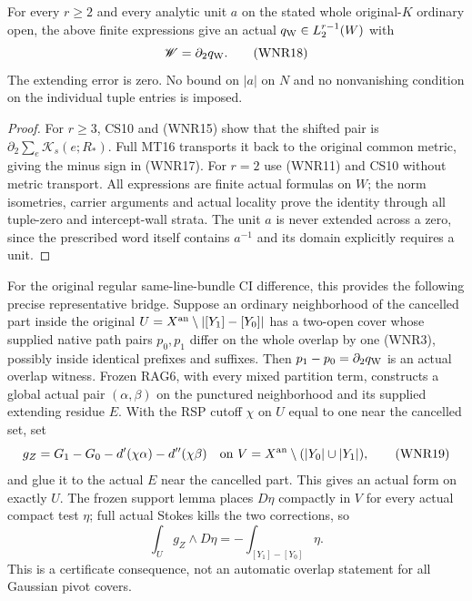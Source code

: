 \begin{theorem}
For every $r\ge2$ and every analytic unit $a$ on the stated whole
original-$K$ ordinary open, the above finite expressions give an
actual $q_{\rm W}\in L_2^{r-1}(W)$ with
\[
                              \mathscr W=\partial_2q_{\rm W}.
 \tag{WNR18}
\]
The extending error is zero.  No bound on $|a|$ on $N$ and no
nonvanishing condition on the individual tuple entries is imposed.
\end{theorem}

\begin{proof}
For $r\ge3$, CS10 and (WNR15) show that the shifted pair is
$\partial_2\sum_e\mathcal K_s(e;R_*)$.  Full MT16 transports
it back to the original common metric, giving the minus sign in
(WNR17).  For $r=2$ use (WNR11) and CS10 without metric transport.
All expressions are finite actual formulas on $W$; the norm
isometries, carrier arguments and actual locality prove the identity
through all tuple-zero and intercept-wall strata.  The unit $a$
is never extended across a zero, since the prescribed word itself
contains $a^{-1}$ and its domain explicitly requires a unit.
\end{proof}

For the original regular same-line-bundle CI difference, this
provides the following precise representative bridge.  Suppose an
ordinary neighborhood of the cancelled part inside the original
$U=X^{\rm an}\setminus|[Y_1]-[Y_0]|$ has a two-open cover whose
supplied native path pairs $p_0,p_1$ differ on the whole overlap
by one (WNR3), possibly inside identical prefixes and suffixes.
Then $p_1-p_0=\partial_2q_{\rm W}$ is an actual overlap witness.
Frozen RAG6, with every mixed partition term, constructs a global
actual pair $(\alpha,\beta)$ on the punctured neighborhood and
its supplied extending residue $E$.  With the RSP cutoff $\chi$
on $U$ equal to one near the cancelled set, set
\[
 g_Z=G_1-G_0-d'(\chi\alpha)-d''(\chi\beta)
 \quad\hbox{on }V=X^{\rm an}\setminus(|Y_0|\cup|Y_1|),
 \tag{WNR19}
\]
and glue it to the actual $E$ near the cancelled part.  This gives
an actual form on exactly $U$.  The frozen support lemma places
$D\eta$ compactly in $V$ for every actual compact test $\eta$;
full actual Stokes kills the two corrections, so
\[
             \int_Ug_Z\wedge D\eta=-\int_{[Y_1]-[Y_0]}\eta.
 \tag{WNR20}
\]
This is a certificate consequence, not an automatic overlap
statement for all Gaussian pivot covers.

